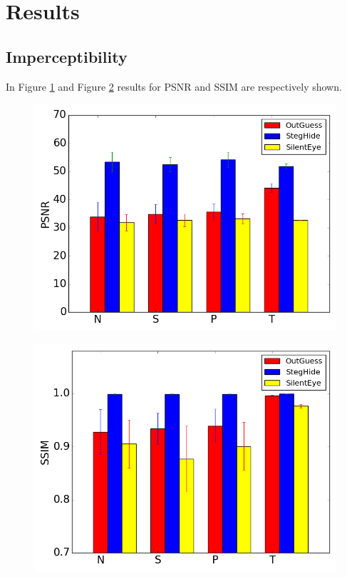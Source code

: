 \documentclass[11pt]{article}
\begin{document}
\section{Results}


\subsection{Imperceptibility}

In Figure \ref{Fig:PSNR} and Figure \ref{Fig:SSIM} results for PSNR and SSIM are respectively shown.

\begin{figure}[h]
\centering
\includegraphics[scale=0.5]{PSNR.png}
\caption{}
\label{Fig:PSNR}
\end{figure}

\begin{figure}[h]
\centering
\includegraphics[scale=0.5]{SSIM.png}
\caption{}
\label{Fig:SSIM}
\end{figure}
\end{document}
